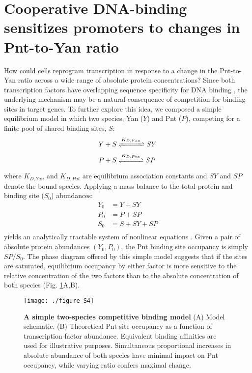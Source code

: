 \section{Cooperative DNA-binding sensitizes promoters to changes in Pnt-to-Yan ratio}

How could cells reprogram transcription in response to a change in the Pnt-to-Yan ratio across a wide range of absolute protein concentrations? Since both transcription factors have overlapping sequence specificity for DNA binding \cite{Xu2000,Halfon2000,Flores2000,Wei2010,Webber2013,Webber2013a,Nitta2015}, the underlying mechanism may be a natural consequence of competition for binding sites in target genes. To further explore this idea, we composed a simple equilibrium model in which two species, Yan ($Y$) and Pnt ($P$), competing for a finite pool of shared binding sites, $S$:
\begin{equation}
\begin{aligned}
Y + S &\xrightleftharpoons{\,K_{D,Yan}\,} SY \\
P + S &\xrightleftharpoons{\,K_{D,Pnt}\,} SP \\
\end{aligned}
\end{equation}
where $K_{D,Yan}$ and $K_{D,Pnt}$ are equilibrium association constants and $SY$ and $SP$ denote the bound species. Applying a mass balance to the total protein and binding site ($S_0$) abundances:
\begin{equation}
\begin{aligned}
Y_0 &= Y + SY \\
P_0 &= P + SP \\
S_0 &= S + SY + SP \\
\end{aligned}
\end{equation}
yields an analytically tractable system of nonlinear equations \cite{Wang1995}. Given a pair of absolute protein abundances $(Y_0,P_0)$, the Pnt binding site occupancy is simply $SP/S_0$. The phase diagram offered by this simple model suggests that if the sites are saturated, equilibrium occupancy by either factor is more sensitive to the relative concentration of the two factors than to the absolute concentration of both species (Fig. \ref{fig:ratio:figS4}A,B).

\begin{figure}[h]
\centering
\texttt{[image: ./figure\_S4]}
\caption[Simple two-species competitive binding model]{\textbf{A simple two-species competitive binding model} (A) Model schematic. (B) Theoretical Pnt site occupancy as a function of transcription factor abundance. Equivalent binding affinities are used for illustrative purposes. Simultaneous proportional increases in absolute abundance of both species have minimal impact on Pnt occupancy, while varying ratio confers maximal change.}
\label{fig:ratio:figS4}
\end{figure}

